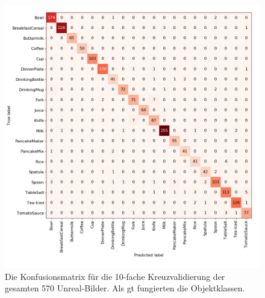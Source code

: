 \begin{figure}
	\includegraphics[scale=.5]{img/chapter6/UnrealGTClass.png}
\caption[Konfusionsmatrix des gesamten Unreal-Bilder Datensatzes mit Objektklassen als GT]{Die Konfusionsmatrix für die 10-fache Kreuzvalidierung der gesamten 570 Unreal-Bilder. Als \gls{gt} fungierten die Objektklassen.}
\label{fig:UnrealGTClass_confMatrix}
\end{figure}

